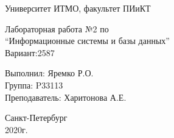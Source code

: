 \documentclass[11pt,a4paper]{article}
\begin{document}
	\begin{center}
	\thispagestyle{empty}
	{\LARGE Университет ИТМО, факультет ПИиКТ}
	\end{center}
	
	\vspace{6em}
	\begin{center}
		{\LARGE Лабораторная работа №2 по \\“Информационные системы и базы данных”\\Вариант:2587}
	\end{center}
	
	\vspace{20em}
	\begin{flushright}
		Выполнил: Яремко Р.О.\\
		Группа: P33113\\
		Преподаватель: Харитонова А.Е.
	\end{flushright}
	
	\vspace{\fill}
	\begin{center}
		Санкт-Петербург\\2020г.
	\end{center}
	
\end{document}
